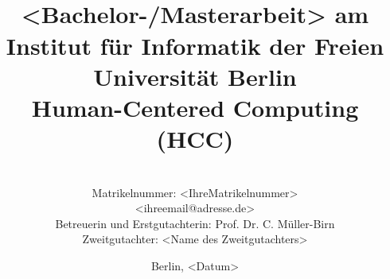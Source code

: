 %
\begin{titlepage}

\title{\\
{\small <Bachelor-/Masterarbeit> am Institut für Informatik der Freien Universität Berlin}\\
{\small Human-Centered Computing (HCC)}\\
[6ex]
{}}

\author{
{\emph{}}\\
{\normalsize Matrikelnummer: <IhreMatrikelnummer>}\\
{\normalsize <ihreemail@adresse.de>}\\ 
[18ex]   
{\normalsize Betreuerin und Erstgutachterin: Prof. Dr. C. Müller-Birn} \\
{\normalsize Zweitgutachter: <Name des Zweitgutachters>}}
\vspace{6ex}
\date{\normalsize Berlin, <Datum>}
 
\maketitle  

\end{titlepage}
